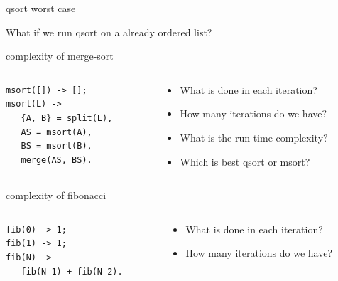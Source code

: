 \begin{frame}{qsort worst case}

What if we run qsort on a already ordered list?

\end{frame}


\begin{frame}[fragile]{complexity of merge-sort}

\begin{columns}
   \begin{column}{.6\linewidth}
    \begin{verbatim}
msort([]) -> [];
msort(L) ->
   {A, B} = split(L),
   AS = msort(A),
   BS = msort(B),
   merge(AS, BS).
   \end{verbatim}
   \end{column}
   \begin{column}{.4\linewidth}
    \begin{itemize}
      \pause \item What is done in each iteration?
      \pause \item How many iterations do we have?       
      \pause \item What is the run-time complexity?       
      \pause \item Which is best qsort or msort?       
    \end{itemize}
   \end{column}
\end{columns}

\end{frame}

\begin{frame}[fragile]{complexity of fibonacci}

\begin{columns}
   \begin{column}{.6\linewidth}
    \begin{verbatim}
fib(0) -> 1;
fib(1) -> 1;
fib(N) ->
   fib(N-1) + fib(N-2).
    \end{verbatim}
   \end{column}
   \begin{column}{.4\linewidth}
    \begin{itemize}
      \pause \item What is done in each iteration?
      \pause \item How many iterations do we have?       
    \end{itemize}
   \end{column}
\end{columns}

\end{frame}


